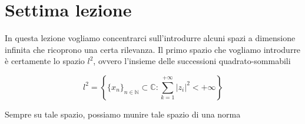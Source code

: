\documentclass[12pt, twoside, italian, openany]{book}
\begin{document}
	\chapter{Settima lezione}
	
	In questa lezione vogliamo concentrarci sull'introdurre alcuni spazi a dimensione infinita che ricoprono una certa rilevanza. Il primo spazio che vogliamo introdurre è certamente lo spazio $l^2$, ovvero l'insieme
	delle successioni quadrato-sommabili
	\begin{definition}[spazio $l^2$]
		\begin{equation*}
		l^2 = \left\{ \{ x_n \}_{n \in \mathbb{N}} \subset \mathbb{C} : \sum_{k=1}^{+\infty} |z_i|^2 < +\infty  \right\}
		\end{equation*}
	\end{definition}
	Sempre su tale spazio, possiamo munire tale spazio di una norma 
\end{document}
